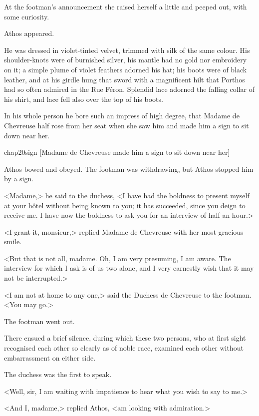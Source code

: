 At the footman's announcement she raised herself a little and peeped out, with some curiosity.

Athos appeared.

He was dressed in violet-tinted velvet, trimmed with silk of the same colour. His shoulder-knots were of burnished silver, his mantle had no gold nor embroidery on it; a simple plume of violet feathers adorned his hat; his boots were of black leather, and at his girdle hung that sword with a magnificent hilt that Porthos had so often admired in the Rue Féron. Splendid lace adorned the falling collar of his shirt, and lace fell also over the top of his boots.

In his whole person he bore such an impress of high degree, that Madame de Chevreuse half rose from her seat when she saw him and made him a sign to sit down near her.

\begin{bwbigpic}
	[\basicscale] 
	{chap20sign}
	[Madame de Chevreuse made him a sign to sit down near her]
\end{bwbigpic}

Athos bowed and obeyed. The footman was withdrawing, but Athos stopped him by a sign.

<Madame,> he said to the duchess, <I have had the boldness to present myself at your hôtel without being known to you; it has succeeded, since you deign to receive me. I have now the boldness to ask you for an interview of half an hour.>

<I grant it, monsieur,> replied Madame de Chevreuse with her most gracious smile.

<But that is not all, madame. Oh, I am very presuming, I am aware. The interview for which I ask is of us two alone, and I very earnestly wish that it may not be interrupted.>

<I am not at home to any one,> said the Duchess de Chevreuse to the footman. <You may go.>

The footman went out.

There ensued a brief silence, during which these two persons, who at first sight recognised each other so clearly as of noble race, examined each other without embarrassment on either side.

The duchess was the first to speak.

<Well, sir, I am waiting with impatience to hear what you wish to say to me.>

<And I, madame,> replied Athos, <am looking with admiration.>

